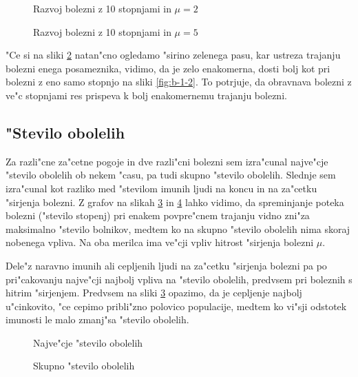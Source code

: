 \documentclass[a4paper,10pt]{article}
\begin{document}
\begin{figure}[!h]
  
  \caption{Razvoj bolezni z 10 stopnjami in $\mu=2$}
  \label{fig:b-7-1}
\end{figure}

\begin{figure}[!h]
  
  \caption{Razvoj bolezni z 10 stopnjami in $\mu=5$}
  \label{fig:b-7-2}
\end{figure}

"Ce si na sliki \ref{fig:b-7-2} natan"cno ogledamo "sirino zelenega pasu, kar ustreza trajanju bolezni enega posameznika, vidimo, da je zelo enakomerna, dosti bolj kot pri bolezni z eno samo stopnjo na sliki \ref{fig:b-1-2}. To potrjuje, da obravnava bolezni z ve"c stopnjami res prispeva k bolj enakomernemu trajanju bolezni. 

\newpage
\subsection{"Stevilo obolelih}

Za razli"cne za"cetne pogoje in dve razli"cni bolezni sem izra"cunal najve"cje "stevilo obolelih ob nekem "casu, pa tudi skupno "stevilo obolelih. Slednje sem izra"cunal kot razliko med "stevilom imunih ljudi na koncu in na za"cetku "sirjenja bolezni. Z grafov na slikah \ref{fig:b-max} in \ref{fig:b-total} lahko vidimo, da spreminjanje poteka bolezni ("stevilo stopenj) pri enakem povpre"cnem trajanju vidno zni"za maksimalno "stevilo bolnikov, medtem ko na skupno "stevilo obolelih nima skoraj nobenega vpliva. Na oba merilca ima ve"cji vpliv hitrost "sirjenja bolezni $\mu$. 
  
Dele"z naravno imunih ali cepljenih ljudi na za"cetku "sirjenja bolezni pa po pri"cakovanju najve"cji najbolj vpliva na "stevilo obolelih, predvsem pri boleznih s hitrim "sirjenjem. Predvsem na sliki \ref{fig:b-max} opazimo, da je cepljenje najbolj u"cinkovito, "ce cepimo pribli"zno polovico populacije, medtem ko vi"sji odstotek imunosti le malo zmanj"sa "stevilo obolelih. 

\begin{figure}[!h]
  
  \caption{Najve"cje "stevilo obolelih}
  \label{fig:b-max}
\end{figure}

\begin{figure}[!h]
  
  \caption{Skupno "stevilo obolelih}
  \label{fig:b-total}
\end{figure}
\end{document}
